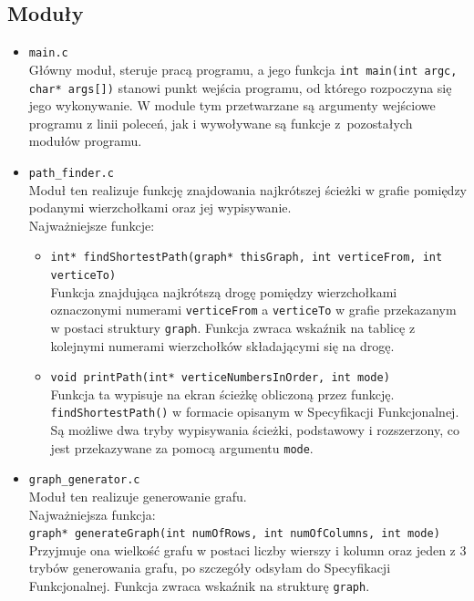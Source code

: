 \documentclass{article}
\begin{document}
\subsection{Moduły}
\label{sec:moduly}
\begin{itemize}
    \item \texttt{main.c} \\
    Główny moduł, steruje pracą programu, a jego funkcja \texttt{int main(int argc, char* args[])} stanowi punkt wejścia programu, od którego rozpoczyna się jego wykonywanie. W module tym przetwarzane są argumenty wejściowe programu z linii poleceń, jak i wywoływane są funkcje z~pozostałych modułów programu.
    \item \texttt{path\_finder.c} \\
    Moduł ten realizuje funkcję znajdowania najkrótszej ścieżki w grafie pomiędzy podanymi wierzchołkami oraz jej wypisywanie. \\
    Najważniejsze funkcje:
    \begin{itemize}
        \item \texttt{int* findShortestPath(graph* thisGraph, int verticeFrom, int verticeTo)} \\
        Funkcja znajdująca najkrótszą drogę pomiędzy wierzchołkami oznaczonymi numerami \texttt{verticeFrom} a \texttt{verticeTo} w grafie przekazanym w postaci struktury \texttt{graph}.
        Funkcja zwraca wskaźnik na tablicę z kolejnymi numerami wierzchołków składającymi się na drogę.
        \item \texttt{void printPath(int* verticeNumbersInOrder, int mode)} \\
        Funkcja ta wypisuje na ekran ścieżkę obliczoną przez funkcję. \texttt{findShortestPath()} w formacie opisanym w Specyfikacji Funkcjonalnej. Są możliwe dwa tryby wypisywania ścieżki, podstawowy i rozszerzony, co jest przekazywane za pomocą argumentu \texttt{mode}.
    \end{itemize}
    \item \texttt{graph\_generator.c} \\
    Moduł ten realizuje generowanie grafu. \\
    Najważniejsza funkcja: \\
    \texttt{graph* generateGraph(int numOfRows, int numOfColumns, int mode)} \\
    Przyjmuje ona wielkość grafu w postaci liczby wierszy i kolumn oraz jeden z 3 trybów generowania grafu, po szczegóły odsyłam do Specyfikacji Funkcjonalnej. Funkcja zwraca wskaźnik na strukturę \texttt{graph}.

\end{itemize}
\end{document}
